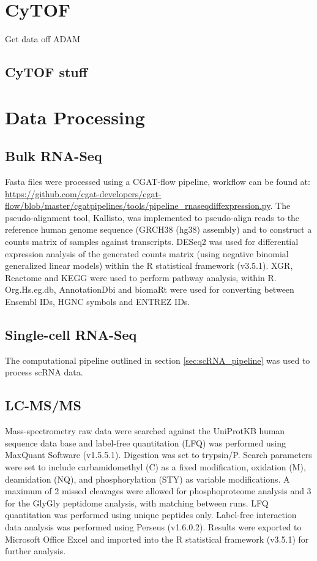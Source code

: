 \section{CyTOF}
Get data off ADAM
\subsection{CyTOF stuff}

\section{Data Processing}\label{sec:data_processing}
\subsection{Bulk RNA-Seq}
Fasta files were processed using a CGAT-flow\cite{sims2014cgat} pipeline, workflow can be found at: \url{https://github.com/cgat-developers/cgat-flow/blob/master/cgatpipelines/tools/pipeline_rnaseqdiffexpression.py}.
The pseudo-alignment tool, Kallisto\cite{bray2016near}, was implemented to pseudo-align reads to the reference human genome sequence (GRCH38 (hg38) assembly) and to construct a counts matrix of samples against transcripts.
DESeq2\cite{love2014moderated} was used for differential expression analysis of the generated  counts  matrix  (using  negative  binomial  generalized  linear  models) within the R statistical framework (v3.5.1).
XGR\cite{fang2016xgr}, Reactome\cite{fabregat2017reactome} and KEGG\cite{kanehisa2017kegg} were used to perform pathway analysis, within R\@.
Org.Hs.eg.db\cite{carlson2019org}, AnnotationDbi\cite{pages2020annotationdbi} and biomaRt\cite{durinck2009mapping} were used for converting between Ensembl IDs, HGNC symbols and ENTREZ IDs.


\subsection{Single-cell RNA-Seq}
The computational pipeline outlined in section \ref{sec:scRNA_pipeline} was used to process scRNA data.

\subsection{LC-MS/MS}
Mass-spectrometry raw data were searched against the UniProtKB human sequence data base and label-free quantitation (LFQ) was performed using MaxQuant Software (v1.5.5.1).
Digestion was set to trypsin/P.
Search parameters were set to include carbamidomethyl (C) as a fixed modification, oxidation (M), deamidation (NQ), and phosphorylation (STY) as variable modifications.
A maximum of 2 missed cleavages were allowed for phosphoproteome analysis and 3 for the GlyGly peptidome analysis, with matching between runs.
LFQ quantitation was performed using unique peptides only.
Label-free interaction data analysis was performed using Perseus (v1.6.0.2).
Results were exported to Microsoft Office Excel and imported into the R statistical framework (v3.5.1) for further analysis.


